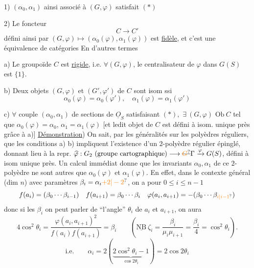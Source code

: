 1) $(\alpha_0,\alpha_1)$ ainsi associé à $(G,\varphi)$ satisfait $(*)$

2) Le foncteur
\[ C\longrightarrow C' \]
défini ainsi par $(G,\varphi)\longmapsto(\alpha_0(\varphi),\alpha_1(\varphi))$ est \uline{ fidèle},
et c'est une  équivalence de catégories  En d'autres termes

a) Le groupoïde $C$ est \uline{rigide}, i.e. $\forall (G,\varphi)$, le centralisateur de
$\varphi$ dans $G(S)$ est $\{1\}$.

b) Deux objets $(G,\varphi)$ et $(G',\varphi')$ de $C$ sont isom ssi
\[\alpha_0(\varphi)=\alpha_0(\varphi'),\quad\alpha_1(\varphi)=\alpha_1(\varphi')\]

c)  $\forall$ couple $(\alpha_0,\alpha_1)$  de sections de $\underline O_S$ satisfaisant $(*),$
$\exists\ (G,\varphi)$  $\mathrm{Ob}\ C$ tel que $\alpha_0(\varphi)=\alpha_0$, $\alpha_1=\alpha_1(\varphi)$ [et
ledit objet de $C$ est défini à isom. unique près grâce à a)]
\uline{Démonstration}) On sait, par les généralités sur les
polyèdres réguliers, que les conditions a) b) impliquent
l'existence d'un $2$-polyèdre régulier  épinglé, donnant lieu à
la repr. $\widehat\varphi:G_2\ (\text{groupe cartographique})\longrightarrow\deleted{\unsure{G}}\Gamma\xrightarrow{\varphi}G(S)$, 
défini à isom unique près. Un calcul immédiat
donne que les invariants $\alpha_0,\alpha_1$ de ce $2$-polyèdre ne sont
autres que $\alpha_0(\varphi)$ et $\alpha_1(\varphi)$. En effet, dans le contexte général
(dim $n$) avec paramètres $\beta_i=\alpha_i\unsure{+2|-2}$, on a pour $0\leq i\leq n-1$
\[ f(a_i)=(\beta_0\cdots\beta_{i-1})\quad f(a_{i+1})=\beta_0\cdots\beta_i\quad \varphi(a_i,a_{i+1})=-(\beta_0\cdots\beta_{\unsure{i|i-1}}) \]
donc si les $\beta_i$   on peut  parler de ``l'angle'' $\theta_i$
de $a_i$ et $a_{i+1}$, on aura
\[4\cos^2\theta_i=\frac{\varphi(a_i,a_{i+1})^2}{f(a_i)f(a_{i+1})}=\beta_i\qquad(\underline{\mathrm{NB}}\ \zeta_i=\frac{\beta_i}{\mu_i\mu_{i+1}}=\frac{\beta_i}{4}=\cos^2\theta_i).\]
\[\text{i.e.}\qquad\alpha_i=2(\underbrace{2\cos^2\theta_i-1}_{\cos2\theta_i})=2\cos2\theta_i\]

